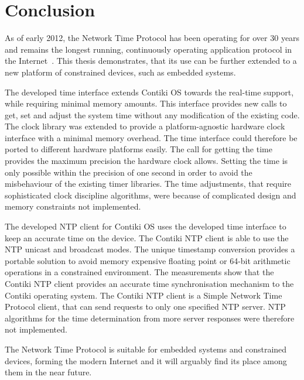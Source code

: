 






\chapter{Conclusion}
As of early 2012, the Network Time Protocol has been operating for over 30 years
and remains the longest running, continuously operating application
protocol in the Internet~\cite{ntp-y2k}.
This thesis demonstrates, that its use can be further extended to a new platform of constrained devices,
such as embedded systems.

The developed time interface extends Contiki OS towards the real-time support,
while requiring minimal memory amounts.
This interface provides new calls to get, set and adjust the system time without any modification
of the existing code.
The clock library was extended to provide a platform-agnostic hardware clock interface
with a minimal memory overhead.
The time interface could therefore be ported to different hardware platforms easily.
The call for getting the time provides the maximum precision the hardware clock allows.
Setting the time is only possible within the precision of one second in order to avoid
the misbehaviour of the existing timer libraries.
The time adjustments, that require sophisticated clock discipline algorithms,
were because of complicated design and memory constraints not implemented.

The developed NTP client for Contiki OS uses the developed time interface to keep an accurate time on the device.
The Contiki NTP client is able to use the NTP unicast and broadcast modes.
The unique timestamp conversion provides a portable solution to avoid
memory expensive floating point or 64-bit arithmetic operations in a constrained environment.
The measurements show that the Contiki NTP client provides an accurate time
synchronisation mechanism to the Contiki operating system.
The Contiki NTP client is a Simple Network Time Protocol client,
that can send requests to only one specified NTP server.
NTP algorithms for the time determination from more server responses were therefore not implemented.

The Network Time Protocol is suitable for embedded systems and constrained devices,
forming the modern Internet and it will arguably find its place among them in the near future.
